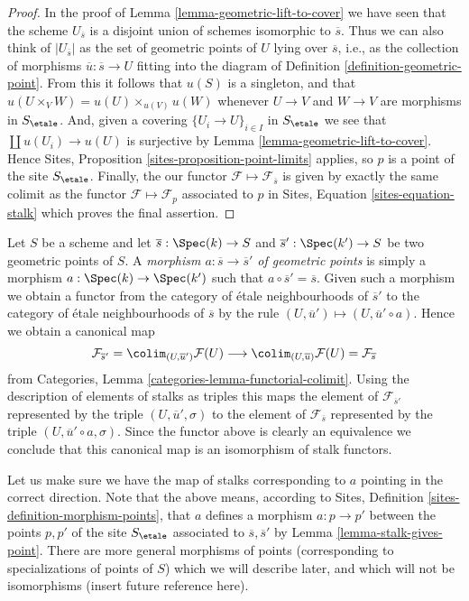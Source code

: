 \begin{proof}
In the proof of
Lemma \ref{lemma-geometric-lift-to-cover}
we have seen that the scheme $U_{\overline{s}}$ is a disjoint union of
schemes isomorphic to $\overline{s}$. Thus we can also think of
$|U_{\overline{s}}|$ as the set of geometric points of $U$ lying over
$\overline{s}$, i.e., as the collection of morphisms
$\overline{u} : \overline{s} \to U$ fitting into the diagram of
Definition \ref{definition-geometric-point}.
From this it follows that $u(S)$ is a singleton, and that
$u(U \times_V W) = u(U) \times_{u(V)} u(W)$
whenever $U \to V$ and $W \to V$ are morphisms in $S_\etale$.
And, given a covering $\{U_i \to U\}_{i \in I}$ in $S_\etale$
we see that $\coprod u(U_i) \to u(U)$ is surjective by
Lemma \ref{lemma-geometric-lift-to-cover}.
Hence
Sites, Proposition \ref{sites-proposition-point-limits}
applies, so $p$ is a point of the site $S_\etale$.
Finally, the our functor $\mathcal{F} \mapsto \mathcal{F}_{\overline{s}}$
is given by exactly the same colimit as the functor
$\mathcal{F} \mapsto \mathcal{F}_p$ associated to $p$ in
Sites, Equation \ref{sites-equation-stalk}
which proves the final assertion.
\end{proof}

\begin{remark}
\label{remark-map-stalks}
Let $S$ be a scheme and let $\overline{s} : \Spec(k) \to S$
and $\overline{s}' : \Spec(k') \to S$ be two geometric points of
$S$. A {\it morphism $a : \overline{s} \to \overline{s}'$ of geometric points}
is simply a morphism $a : \Spec(k) \to \Spec(k')$ such that
$a \circ \overline{s}' = \overline{s}$. Given such a morphism we obtain
a functor from the category of \'etale neighbourhoods of $\overline{s}'$
to the category of \'etale neighbourhoods of $\overline{s}$ by the rule
$(U, \overline{u}') \mapsto (U, \overline{u}' \circ a)$. Hence we obtain
a canonical map
$$
\mathcal{F}_{\overline{s}'}
=
\colim_{(U, \overline{u}')} \mathcal{F}(U)
\longrightarrow
\colim_{(U, \overline{u})} \mathcal{F}(U)
=
\mathcal{F}_{\overline{s}}
$$
from Categories, Lemma \ref{categories-lemma-functorial-colimit}. Using the
description of elements of stalks as triples this maps the element of
$\mathcal{F}_{\overline{s}'}$ represented by the triple
$(U, \overline{u}', \sigma)$ to the element of $\mathcal{F}_{\overline{s}}$
represented by the triple $(U, \overline{u}' \circ a, \sigma)$.
Since the functor above is clearly an equivalence we conclude that this
canonical map is an isomorphism of stalk functors.

\medskip\noindent
Let us make sure we have the map of stalks corresponding to $a$ pointing
in the correct direction. Note that the above means, according to
Sites, Definition \ref{sites-definition-morphism-points},
that $a$ defines a morphism $a : p \to p'$ between the points $p, p'$ of
the site $S_\etale$ associated to $\overline{s}, \overline{s}'$ by
Lemma \ref{lemma-stalk-gives-point}. There are more general morphisms of
points (corresponding to specializations of points of $S$) which we will
describe later, and which will not be isomorphisms (insert future
reference here).
\end{remark}

